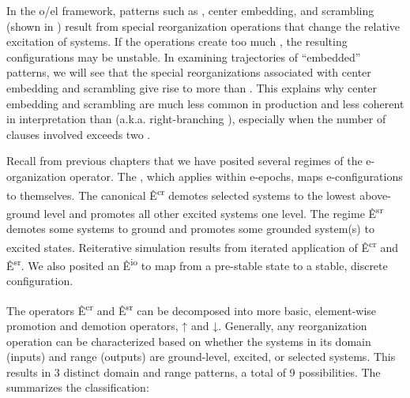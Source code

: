   In the o/el framework, patterns such as , center embedding, and scrambling (shown in {}) result from special reorganization operations that change the relative excitation of systems. If the operations create too much , the resulting configurations may be unstable. In examining trajectories of “embedded” patterns, we will see that the special reorganizations associated with center embedding and scrambling give rise to more  than . This explains why center embedding and scrambling are much less common in production and less coherent in interpretation than  (a.k.a. right-branching ), especially when the number of clauses involved exceeds two \citep{ChristiansenChater1999}. 

  Recall from previous chapters that we have posited several regimes of the e-organization operator. The , which applies within e-epochs, maps e-con\-fig\-u\-ra\-tions to themselves. The canonical  Ê\textsuperscript{cr} demotes selected systems to the lowest above-ground level and promotes all other excited systems one level. The  regime Ê\textsuperscript{sr} demotes some systems to ground and promotes some grounded system(s) to excited states. Reiterative simulation results from iterated application of Ê\textsuperscript{cr} and Ê\textsuperscript{sr}. We also posited an  Ê\textsuperscript{io} to map from a pre-stable state to a stable, discrete configuration.

  The operators Ê\textsuperscript{cr} and Ê\textsuperscript{sr} can be decomposed into more basic, element-wise promotion and demotion operators, ↑ and ↓. Generally, any reorganization operation can be characterized based on whether the systems in its domain (inputs) and range (outputs) are ground-level, excited, or selected systems. This results in 3 distinct domain and range patterns, a total of 9 possibilities. The {} summarizes the classification:

